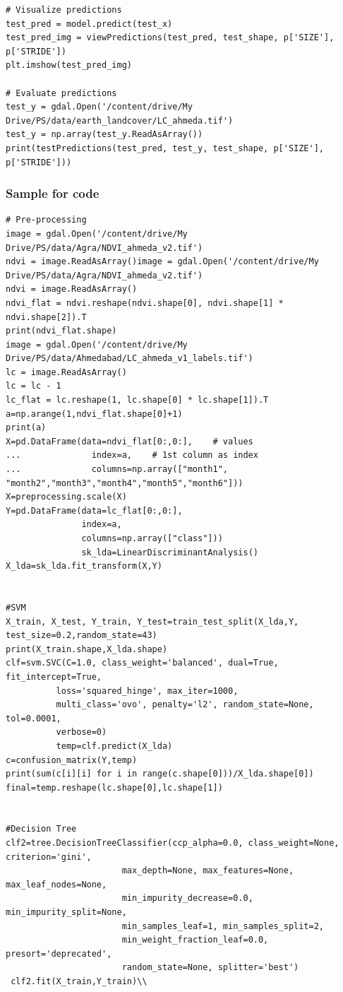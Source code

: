 \documentclass[12pt, a4paper]{report}
\begin{document}
\begin{verbatim}
# Visualize predictions
test_pred = model.predict(test_x)
test_pred_img = viewPredictions(test_pred, test_shape, p['SIZE'], p['STRIDE'])
plt.imshow(test_pred_img)

# Evaluate predictions
test_y = gdal.Open('/content/drive/My Drive/PS/data/earth_landcover/LC_ahmeda.tif')
test_y = np.array(test_y.ReadAsArray())
print(testPredictions(test_pred, test_y, test_shape, p['SIZE'], p['STRIDE']))
\end{verbatim}

\subsubsection*{Sample for code}
\begin{verbatim}
# Pre-processing 
image = gdal.Open('/content/drive/My Drive/PS/data/Agra/NDVI_ahmeda_v2.tif')
ndvi = image.ReadAsArray()image = gdal.Open('/content/drive/My Drive/PS/data/Agra/NDVI_ahmeda_v2.tif')
ndvi = image.ReadAsArray()
ndvi_flat = ndvi.reshape(ndvi.shape[0], ndvi.shape[1] * ndvi.shape[2]).T
print(ndvi_flat.shape)
image = gdal.Open('/content/drive/My Drive/PS/data/Ahmedabad/LC_ahmeda_v1_labels.tif')
lc = image.ReadAsArray()
lc = lc - 1
lc_flat = lc.reshape(1, lc.shape[0] * lc.shape[1]).T
a=np.arange(1,ndvi_flat.shape[0]+1)
print(a)
X=pd.DataFrame(data=ndvi_flat[0:,0:],    # values
...              index=a,    # 1st column as index
...              columns=np.array(["month1", "month2","month3","month4","month5","month6"]))
X=preprocessing.scale(X)
Y=pd.DataFrame(data=lc_flat[0:,0:],
               index=a,
               columns=np.array(["class"]))
               sk_lda=LinearDiscriminantAnalysis()
X_lda=sk_lda.fit_transform(X,Y)


#SVM
X_train, X_test, Y_train, Y_test=train_test_split(X_lda,Y, test_size=0.2,random_state=43)
print(X_train.shape,X_lda.shape)
clf=svm.SVC(C=1.0, class_weight='balanced', dual=True, fit_intercept=True,
          loss='squared_hinge', max_iter=1000,
          multi_class='ovo', penalty='l2', random_state=None, tol=0.0001,
          verbose=0)
          temp=clf.predict(X_lda)
c=confusion_matrix(Y,temp)
print(sum(c[i][i] for i in range(c.shape[0]))/X_lda.shape[0])
final=temp.reshape(lc.shape[0],lc.shape[1])


#Decision Tree          
clf2=tree.DecisionTreeClassifier(ccp_alpha=0.0, class_weight=None, criterion='gini',
                       max_depth=None, max_features=None, max_leaf_nodes=None,
                       min_impurity_decrease=0.0, min_impurity_split=None,
                       min_samples_leaf=1, min_samples_split=2,
                       min_weight_fraction_leaf=0.0, presort='deprecated',
                       random_state=None, splitter='best')    
 clf2.fit(X_train,Y_train)\\



\end{verbatim}
\end{document}
